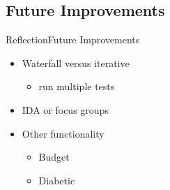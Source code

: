 \subsection{Future Improvements}
\begin{frame}{Reflection}{Future Improvements}
	\begin{itemize}
		\item Waterfall versus iterative
		\begin{itemize}
			\item run multiple tests
		\end{itemize}
		\item IDA or focus groups
		\item Other functionality
		\begin{itemize}
			\item Budget
			\item Diabetic
		\end{itemize}
	\end{itemize}
\end{frame}
